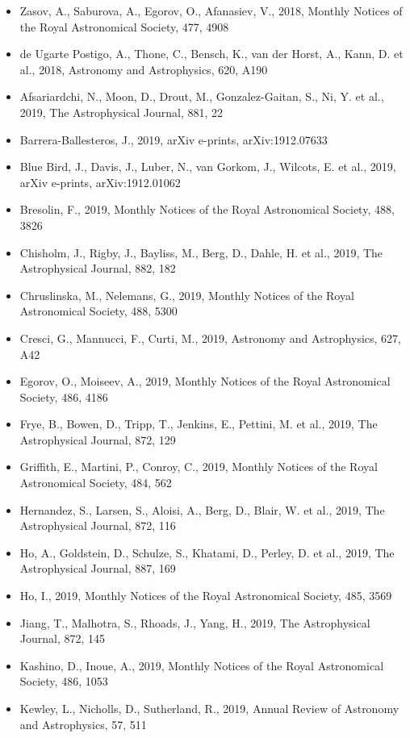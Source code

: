 \documentclass{letter}
\begin{document}
\begin{enumerate}
\begin{itemize}
\item Zasov, A., Saburova, A., Egorov, O., Afanasiev, V., 2018, Monthly Notices of the Royal Astronomical Society, 477, 4908
\item de Ugarte Postigo, A., Thone, C., Bensch, K., van der Horst, A., Kann, D. et al., 2018, Astronomy and Astrophysics, 620, A190
\item Afsariardchi, N., Moon, D., Drout, M., Gonzalez-Gaitan, S., Ni, Y. et al., 2019, The Astrophysical Journal, 881, 22
\item Barrera-Ballesteros, J., 2019, arXiv e-prints, arXiv:1912.07633
\item Blue Bird, J., Davis, J., Luber, N., van Gorkom, J., Wilcots, E. et al., 2019, arXiv e-prints, arXiv:1912.01062
\item Bresolin, F., 2019, Monthly Notices of the Royal Astronomical Society, 488, 3826
\item Chisholm, J., Rigby, J., Bayliss, M., Berg, D., Dahle, H. et al., 2019, The Astrophysical Journal, 882, 182
\item Chruslinska, M., Nelemans, G., 2019, Monthly Notices of the Royal Astronomical Society, 488, 5300
\item Cresci, G., Mannucci, F., Curti, M., 2019, Astronomy and Astrophysics, 627, A42
\item Egorov, O., Moiseev, A., 2019, Monthly Notices of the Royal Astronomical Society, 486, 4186
\item Frye, B., Bowen, D., Tripp, T., Jenkins, E., Pettini, M. et al., 2019, The Astrophysical Journal, 872, 129
\item Griffith, E., Martini, P., Conroy, C., 2019, Monthly Notices of the Royal Astronomical Society, 484, 562
\item Hernandez, S., Larsen, S., Aloisi, A., Berg, D., Blair, W. et al., 2019, The Astrophysical Journal, 872, 116
\item Ho, A., Goldstein, D., Schulze, S., Khatami, D., Perley, D. et al., 2019, The Astrophysical Journal, 887, 169
\item Ho, I., 2019, Monthly Notices of the Royal Astronomical Society, 485, 3569
\item Jiang, T., Malhotra, S., Rhoads, J., Yang, H., 2019, The Astrophysical Journal, 872, 145
\item Kashino, D., Inoue, A., 2019, Monthly Notices of the Royal Astronomical Society, 486, 1053
\item Kewley, L., Nicholls, D., Sutherland, R., 2019, Annual Review of Astronomy and Astrophysics, 57, 511

\end{itemize}
\end{enumerate}
\end{document}
